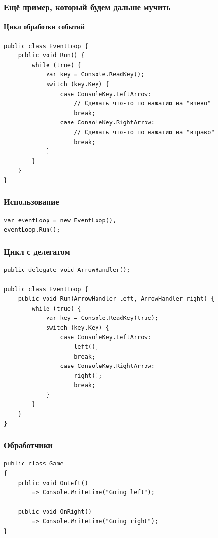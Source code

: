 \documentclass{../../slides-style}
\begin{document}
    \begin{frame}[fragile]
        \frametitle{Ещё пример, который будем дальше мучить}
        \framesubtitle{Цикл обработки событий}
        \begin{footnotesize}
            \begin{verbatim}
public class EventLoop {
    public void Run() {
        while (true) {
            var key = Console.ReadKey();
            switch (key.Key) {
                case ConsoleKey.LeftArrow:
                    // Сделать что-то по нажатию на "влево"
                    break;
                case ConsoleKey.RightArrow:
                    // Сделать что-то по нажатию на "вправо"
                    break;
            }
        }
    }
}
            \end{verbatim}
        \end{footnotesize}
    \end{frame}

    \begin{frame}[fragile]
        \frametitle{Использование}
        \begin{verbatim}
var eventLoop = new EventLoop();
eventLoop.Run();
        \end{verbatim}
    \end{frame}

    \begin{frame}[fragile]
        \frametitle{Цикл с делегатом}
        \begin{footnotesize}
            \begin{verbatim}
public delegate void ArrowHandler();

public class EventLoop {
    public void Run(ArrowHandler left, ArrowHandler right) {
        while (true) {
            var key = Console.ReadKey(true);
            switch (key.Key) {
                case ConsoleKey.LeftArrow:
                    left();
                    break;
                case ConsoleKey.RightArrow:
                    right();
                    break;
            }
        }
    }
}
            \end{verbatim}
        \end{footnotesize}
    \end{frame}

    \begin{frame}[fragile]
        \frametitle{Обработчики}
        \begin{verbatim}
public class Game
{
    public void OnLeft()
        => Console.WriteLine("Going left");

    public void OnRight()
        => Console.WriteLine("Going right");
}
        \end{verbatim}
    \end{frame}
\end{document}
